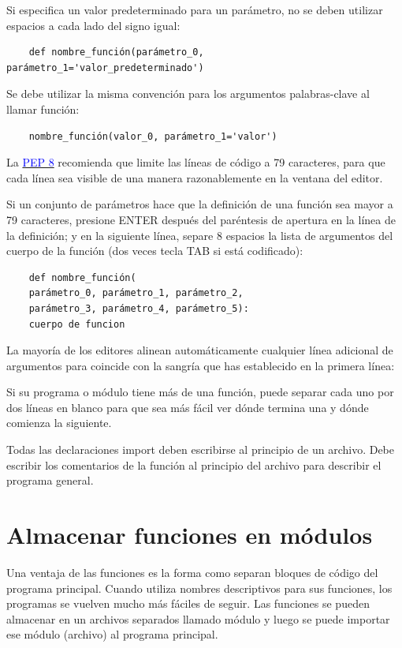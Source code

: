 Si especifica un valor predeterminado para un parámetro, no se deben utilizar espacios a cada lado del signo igual:

\begin{lstlisting}
	def nombre_función(parámetro_0, parámetro_1='valor_predeterminado')
\end{lstlisting}

Se debe utilizar la misma convención para los argumentos palabras-clave al llamar función:

\begin{lstlisting}
	nombre_función(valor_0, parámetro_1='valor')
\end{lstlisting}


La \href{https://www.python.org/dev/peps/pep-0008}{\textcolor{blue}{PEP 8}} recomienda que
limite las líneas de código a 79 caracteres, para que cada línea sea visible de una manera razonablemente
en la ventana del editor.

Si un conjunto de parámetros hace que la definición de una función sea mayor a 79 caracteres, presione ENTER después del paréntesis de apertura en la línea de la definición; y en la siguiente línea, separe 8 espacios la lista de argumentos del cuerpo de la función (dos veces tecla TAB si está codificado):

\begin{lstlisting}
	def nombre_función(
	parámetro_0, parámetro_1, parámetro_2,
	parámetro_3, parámetro_4, parámetro_5):
	cuerpo de funcion
\end{lstlisting}

La mayoría de los editores alinean automáticamente cualquier línea adicional de argumentos para
coincide con la sangría que has establecido en la primera línea:


Si su programa o módulo tiene más de una función, puede separar
cada uno por dos líneas en blanco para que sea más fácil ver dónde 
termina una y dónde comienza la siguiente.

Todas las declaraciones  {\ttfamily import} deben escribirse al principio de un archivo. 
Debe escribir los comentarios de la función al principio del archivo para describir el programa general.




\section{Almacenar funciones en módulos}

Una ventaja de las funciones es la forma como separan bloques de código del
programa principal. Cuando utiliza nombres descriptivos para sus funciones, los programas se vuelven mucho más fáciles de seguir. Las funciones se pueden almacenar en un archivos separados llamado módulo y luego se puede importar ese  módulo (archivo) al programa principal. 

